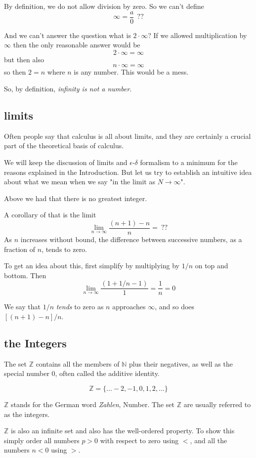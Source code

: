 \documentclass[11pt, oneside]{article}
\begin{document}
By definition, we do not allow division by zero.  So we can't define
\[ \infty = \frac{a}{0} \ \ ?? \]

And we can't answer the question what is $2 \cdot \infty$?  If we allowed multiplication by $\infty$ then the only reasonable answer would be
\[ 2 \cdot \infty = \infty \]
but then also
\[ n \cdot \infty = \infty \]
so then $2 = n$ where $n$ is any number.  This would be a mess.

So, by definition, \emph{infinity is not a number}.

\subsection*{limits}
Often people say that calculus is all about limits, and they are certainly a crucial part of the theoretical basis of calculus.  

We will keep the discussion of limits and $\epsilon$-$\delta$ formalism to a minimum for the reasons explained in the Introduction.  But let us try to establish an intuitive idea about what we mean when we say "in the limit as $N \rightarrow \infty$".

Above we had that there is no greatest integer.

A corollary of that is the limit
\[ \lim_{n \rightarrow \infty} \frac{(n + 1) - n}{n} = \ ?? \]
As $n$ increases without bound, the difference between successive numbers, as a fraction of $n$, tends to zero.

To get an idea about this, first simplify by multiplying by $1/n$ on top and bottom.  Then
\[ \lim_{n \rightarrow \infty} \frac{(1 + 1/n - 1)}{1} = \frac{1}{n} = 0 \]

We say that $1/n$ \emph{tends} to zero as $n$ approaches $\infty$, and so does $[(n+1)-n]/n$.

\subsection*{the Integers}

The set $\mathbb{Z}$ contains all the members of $\mathbb{N}$ plus their negatives, as well as the special number $0$, often called the additive identity.

\[ \mathbb{Z} = \{ \dots -2, -1, 0, 1, 2, \dots \} \]

$\mathbb{Z}$ stands for the German word \emph{Zahlen}, Number.  The set $\mathbb{Z}$ are usually referred to as the integers.

$\mathbb{Z}$ is also an infinite set and also has the well-ordered property.  To show this simply order all numbers $p > 0$ with respect to zero using $<$, and all the numbers $n < 0$ using $>$.
\end{document}
